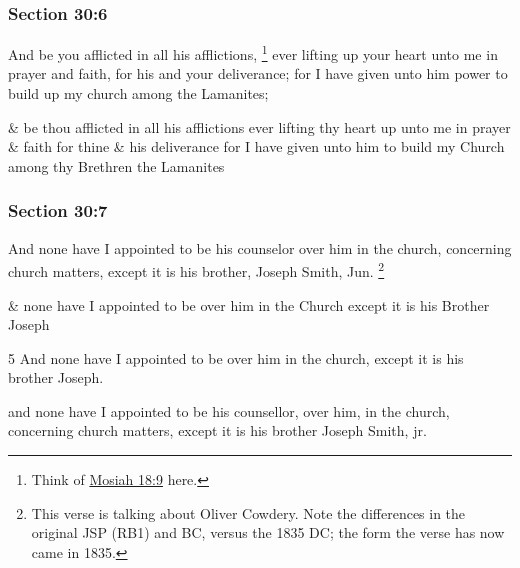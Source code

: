 	\subsubsection{Section 30:6} %
		\label{DC30-6}

		And be you afflicted in all his afflictions,%
		\footnote{%
			Think of \hyperref[MOSIAH-18-9]{Mosiah 18:9} here.
			} 
		ever lifting up your heart unto me in prayer and faith, for his and your deliverance; for I have given unto him power to build up my church among the Lamanites;

		\begin{framed}
		\scriptsize
			\begin{compactdesc}
				\item[JSP] \& be thou afflicted in all his afflictions ever lifting thy heart up unto me in prayer \& faith for thine \& his deliverance for I have given unto him to build my Church among thy Brethren the Lamanites
			\end{compactdesc}
		\end{framed}

	\subsubsection{Section 30:7} %
		\label{DC30-7}

		And none have I appointed to be his counselor over him in the church, concerning church matters, except it is his brother, Joseph Smith, Jun.%
			\footnote{%
				This verse is talking about Oliver Cowdery. Note the differences in the original JSP (RB1) and BC, versus the 1835 DC; the form the verse has now came in 1835.
				}

		\begin{framed}
		\scriptsize
			\begin{compactdesc}
				\item[JSP] \& none have I appointed to be over him in the Church except it is his Brother Joseph
				\item[BC] 5 And none have I appointed to be over him in the church, except it is his brother Joseph.
				\item[DC 1835] and none have I appointed to be his counsellor, over him, in the church, concerning church matters, except it is his brother Joseph Smith, jr.
			\end{compactdesc}
		\end{framed}

